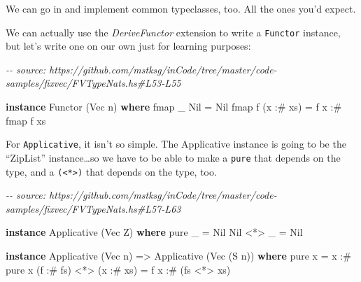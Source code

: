 \documentclass[]{article}
\newenvironment{Shaded}{}{}
\newcommand{\CommentTok}[1]{\textcolor[rgb]{0.38,0.63,0.69}{\textit{#1}}}
\newcommand{\DataTypeTok}[1]{\textcolor[rgb]{0.56,0.13,0.00}{#1}}
\newcommand{\FunctionTok}[1]{\textcolor[rgb]{0.02,0.16,0.49}{#1}}
\newcommand{\KeywordTok}[1]{\textcolor[rgb]{0.00,0.44,0.13}{\textbf{#1}}}
\newcommand{\NormalTok}[1]{#1}
\newcommand{\OperatorTok}[1]{\textcolor[rgb]{0.40,0.40,0.40}{#1}}
\newcommand{\OtherTok}[1]{\textcolor[rgb]{0.00,0.44,0.13}{#1}}
\begin{document}
We can go in and implement common typeclasses, too. All the ones you'd expect.

We can actually use the \emph{DeriveFunctor} extension to write a
\texttt{Functor} instance, but let's write one on our own just for learning
purposes:

\begin{Shaded}
\begin{Highlighting}[]
\CommentTok{{-}{-} source: https://github.com/mstksg/inCode/tree/master/code{-}samples/fixvec/FVTypeNats.hs\#L53{-}L55}

\KeywordTok{instance} \DataTypeTok{Functor}\NormalTok{ (}\DataTypeTok{Vec}\NormalTok{ n) }\KeywordTok{where}
    \FunctionTok{fmap}\NormalTok{ \_ }\DataTypeTok{Nil}       \OtherTok{=} \DataTypeTok{Nil}
    \FunctionTok{fmap}\NormalTok{ f (x }\OperatorTok{:\#}\NormalTok{ xs) }\OtherTok{=}\NormalTok{ f x }\OperatorTok{:\#} \FunctionTok{fmap}\NormalTok{ f xs}
\end{Highlighting}
\end{Shaded}

For \texttt{Applicative}, it isn't so simple. The Applicative instance is going
to be the ``ZipList'' instance\ldots so we have to be able to make a
\texttt{pure} that depends on the type, and a
\texttt{(\textless{}*\textgreater{})} that depends on the type, too.

\begin{Shaded}
\begin{Highlighting}[]
\CommentTok{{-}{-} source: https://github.com/mstksg/inCode/tree/master/code{-}samples/fixvec/FVTypeNats.hs\#L57{-}L63}

\KeywordTok{instance} \DataTypeTok{Applicative}\NormalTok{ (}\DataTypeTok{Vec} \DataTypeTok{Z}\NormalTok{) }\KeywordTok{where}
    \FunctionTok{pure}\NormalTok{ \_    }\OtherTok{=} \DataTypeTok{Nil}
    \DataTypeTok{Nil} \OperatorTok{<*>}\NormalTok{ \_ }\OtherTok{=} \DataTypeTok{Nil}

\KeywordTok{instance} \DataTypeTok{Applicative}\NormalTok{ (}\DataTypeTok{Vec}\NormalTok{ n) }\OtherTok{=>} \DataTypeTok{Applicative}\NormalTok{ (}\DataTypeTok{Vec}\NormalTok{ (}\DataTypeTok{S}\NormalTok{ n)) }\KeywordTok{where}
    \FunctionTok{pure}\NormalTok{ x }\OtherTok{=}\NormalTok{ x }\OperatorTok{:\#} \FunctionTok{pure}\NormalTok{ x}
\NormalTok{    (f }\OperatorTok{:\#}\NormalTok{ fs) }\OperatorTok{<*>}\NormalTok{ (x }\OperatorTok{:\#}\NormalTok{ xs) }\OtherTok{=}\NormalTok{ f x }\OperatorTok{:\#}\NormalTok{ (fs }\OperatorTok{<*>}\NormalTok{ xs)}
\end{Highlighting}
\end{Shaded}
\end{document}
